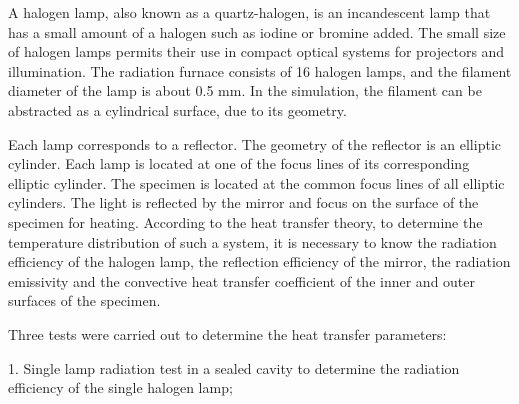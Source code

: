 A halogen lamp, also known as a quartz-halogen, is an incandescent lamp that has a small amount of a halogen such as iodine or bromine added.
The small size of halogen lamps permits their use in compact optical systems for projectors and illumination.
The radiation furnace consists of 16 halogen lamps, and the filament diameter of the lamp is about 0.5 mm. In the simulation, the filament can be abstracted as a cylindrical surface, due to its geometry.

Each lamp corresponds to a reflector. The geometry of the reflector is an elliptic cylinder. Each lamp is located at one of the focus
lines of its corresponding elliptic cylinder. The specimen is located at the common focus lines of all elliptic cylinders. The light is reflected by the mirror and focus on the surface of the specimen for heating.
According to the heat transfer theory, to determine the temperature distribution of such a system, it is necessary to know the radiation efficiency of the halogen lamp, the reflection efficiency of the mirror, the radiation emissivity and the convective heat transfer coefficient of the inner and outer surfaces of the specimen.

Three tests were carried out to determine the heat transfer parameters:

1. Single lamp radiation test in a sealed cavity to determine the radiation efficiency of the single halogen lamp;


